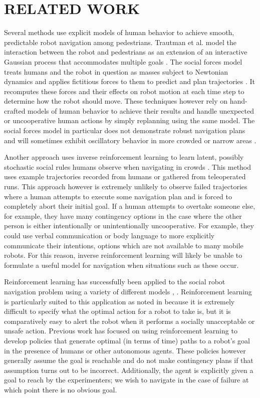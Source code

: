 \documentclass[letterpaper, 10 pt, conference]{ieeeconf}  %
\begin{document}
\section{RELATED WORK}
	Several methods use explicit models of human behavior to achieve smooth, predictable robot navigation among pedestrians. Trautman et al. model the interaction between the robot and pedestrians as an extension of an interactive Gaussian process that accommodates multiple goals \cite{caseforcoop}. The social forces model treats humans and the robot in question as masses subject to Newtonian dynamics and applies fictitious forces to them to predict and plan trajectories \cite{sfm}. It recomputes these forces and their effects on robot motion at each time step to determine how the robot should move. These techniques however rely on hand-crafted models of human behavior to achieve their results and handle unexpected or uncooperative human actions by simply replanning using the same model. The social forces model in particular does not demonstrate robust navigation plans and will sometimes exhibit oscillatory behavior in more crowded or narrow areas \cite{sfm}.
	
	Another approach uses inverse reinforcement learning to learn latent, possibly stochastic social rules humans observe when navigating in crowds \cite{socialirl}. This method uses example trajectories recorded from humans or gathered from teleoperated runs. This approach however is extremely unlikely to observe failed trajectories where a human attempts to execute some navigation plan and is forced to completely abort their initial goal. If a human attempts to overtake someone else, for example, they have many contingency options in the case where the other person is either intentionally or unintentionally uncooperative. For example, they could use verbal communication or body language to more explicitly communicate their intentions, options which are not available to many mobile robots. For this reason, inverse reinforcement learning will likely be unable to formulate a useful model for navigation when situations such as these occur.
	
	Reinforcement learning has successfully been applied to the social robot navigation problem using a variety of different models \cite{sociallyawarerl}, \cite{crowdawarerl}. Reinforcement learning is particularly suited to this application as noted in \cite{sociallyawarerl} because it is extremely difficult to specify what the optimal action for a robot to take is, but it is comparatively easy to alert the robot when it performs a socially unacceptable or unsafe action. Previous work has focused on using reinforcement learning to develop policies that generate optimal (in terms of time) paths to a robot's goal in the presence of humans or other autonomous agents. These policies however generally assume the goal is reachable and do not make contingency plans if that assumption turns out to be incorrect. Additionally, the agent is explicitly given a goal to reach by the experimenters; we wish to navigate in the case of failure at which point there is no obvious goal.
	
\end{document}
